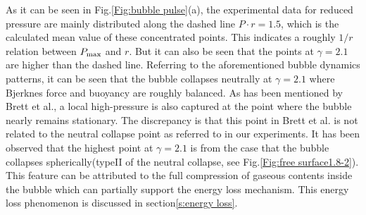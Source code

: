 \documentclass[%
 aip,
 amsmath,amssymb,
 reprint,%
]{revtex4-1}
\begin{document}
{\begin{figure}
\end{figure}
As it can be seen in Fig.\ref{Fig:bubble pulse}(a), the experimental data for reduced pressure are mainly distributed along the dashed line $P\cdot r=1.5$, which is the calculated mean value of these concentrated points. This indicates a roughly $1/r$ relation between $P_{\rm max}$ and $r$. But it can also be seen that the points at $\gamma=2.1$ are higher than the dashed line. Referring to the aforementioned bubble dynamics patterns, it can be seen that the bubble collapses neutrally at $\gamma=2.1$ where Bjerknes force and buoyancy are roughly balanced. As has been mentioned by Brett et al.\cite{RN2631}, a local high-pressure is also captured at the point where the bubble nearly remains stationary. The discrepancy is that this point in Brett et al.\citep{RN2631} is not related to the neutral collapse point as referred to in our experiments. It has been observed that the highest point at $\gamma=2.1$ is from the case that the bubble collapses spherically(typeII of the neutral collapse, see Fig.\ref{Fig:free surface1.8-2}). This feature can be attributed to the full compression of gaseous contents inside the bubble \citep{RN2631} which can partially support the energy loss mechanism. This energy loss phenomenon is discussed in section\ref{s:energy loss}.  

}
\end{document}
